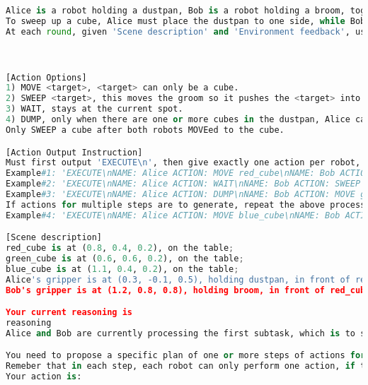 \begin{lstlisting}[language=Python]
Alice is a robot holding a dustpan, Bob is a robot holding a broom, together they must firstly sweep up the blue cube and dump it into the trash bin, secondly sweep up the green cube and dump into the trash bin, thirdly sweep up the red cube and dump into the trash bin, the order can not be disrupted.
To sweep up a cube, Alice must place the dustpan to one side, while Bob must sweep the cube from the other side into the dustpan.
At each round, given 'Scene description' and 'Environment feedback', use it to reason about the task, and improve any previous plans. Each robot does **exactly** one action per round.



[Action Options]
1) MOVE <target>, <target> can only be a cube.
2) SWEEP <target>, this moves the groom so it pushes the <target> into dustpan, only Bob can SWEEP, Alice must WAIT in front of the same <target> cube when Bob SWEEP.
3) WAIT, stays at the current spot.
4) DUMP, only when there are one or more cubes in the dustpan, Alice can DUMP it into trash_bin.
Only SWEEP a cube after both robots MOVEed to the cube.

[Action Output Instruction]
Must first output 'EXECUTE\n', then give exactly one action per robot, put each on a new line.
Example#1: 'EXECUTE\nNAME: Alice ACTION: MOVE red_cube\nNAME: Bob ACTION: MOVE red_cube\n'
Example#2: 'EXECUTE\nNAME: Alice ACTION: WAIT\nNAME: Bob ACTION: SWEEP red_cube\n'
Example#3: 'EXECUTE\nNAME: Alice ACTION: DUMP\nNAME: Bob ACTION: MOVE green_cube\n'
If actions for multiple steps are to generate, repeat the above process and follow the format strictly.
Example#4: 'EXECUTE\nNAME: Alice ACTION: MOVE blue_cube\nNAME: Bob ACTION: WAIT\nEXECUTE\nNAME: Alice ACTION: WAIT\nNAME: Bob ACTION: SWEEP blue_cube\n'

[Scene description]
red_cube is at (0.8, 0.4, 0.2), on the table; 
green_cube is at (0.6, 0.6, 0.2), on the table; 
blue_cube is at (1.1, 0.4, 0.2), on the table; 
Alice's gripper is at (0.3, -0.1, 0.5), holding dustpan, in front of red_cube with distance: 0.62, in front of green_cube with distance: 0.59, in front of blue_cube with distance: 0.89
Bob's gripper is at (1.2, 0.8, 0.8), holding broom, in front of red_cube with distance: 0.59, in front of green_cube with distance: 0.63, in front of blue_cube with distance: 0.47

Your current reasoning is
reasoning
Alice and Bob are currently processing the first subtask, which is to sweep up the blue cube and dump it into the trash bin. In the current state, Alice is in front of the blue cube, and Bob is in front of the red cube. Alice should MOVE to the blue cube, and Bob should WAIT.

You need to propose a specific plan of one or more steps of actions for each robot faithfully based on reasoning thought. Write and output the plan strictly in the format of [Action Output Instruction].
Remeber that in each step, each robot can only perform one action, if the reasoning thought is about several steps, you should create a new step action plan following the action output intrstruction for each step.
Your action is:

    
\end{lstlisting}

